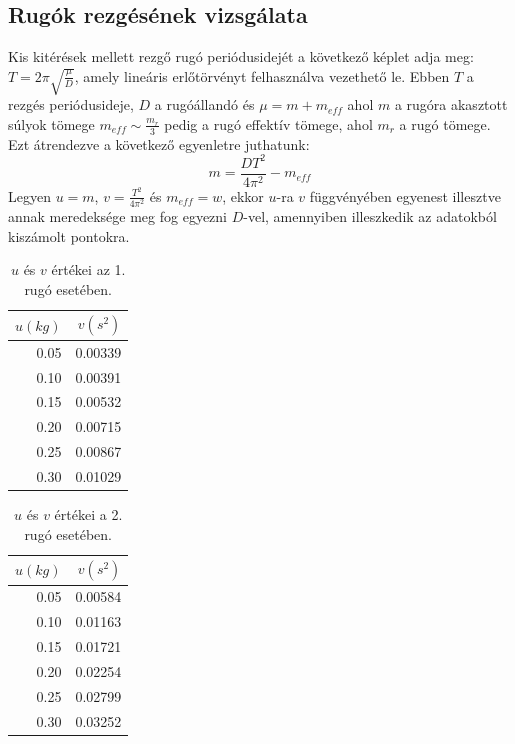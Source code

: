\documentclass[10pt,pdftex]{report}
\begin{document}
\subsection*{Rugók rezgésének vizsgálata}
Kis kitérések mellett rezgő rugó periódusidejét a következő képlet adja meg:$T=2\pi\sqrt{\frac{\mu}{D}}$, amely lineáris erlőtörvényt felhasználva vezethető le. Ebben $T$ a rezgés periódusideje, $D$ a rugóállandó és $\mu=m+m_{eff}$ ahol $m$ a rugóra akasztott súlyok tömege $m_{eff}\sim \frac{m_r}{3}$ pedig a rugó effektív tömege, ahol $m_r$ a rugó tömege. Ezt átrendezve a következő egyenletre juthatunk:
\begin{equation*}
    m=\frac{DT^2}{4\pi^2}-m_{eff}
\end{equation*}
Legyen $u=m$, $v=\frac{T^2}{4\pi^2}$ és $m_{eff}=w$, ekkor $u$-ra $v$ függvényében egyenest illesztve annak meredeksége meg fog egyezni $D$-vel, amennyiben illeszkedik az adatokból kiszámolt pontokra.
\begin{table}[H]
    \centering
    \begin{tabular}{|r|r|}
        \hline
        $u(kg)$ & $v(s^2)$ \\
        \hline
        0.05 & 0.00339 \\
        \hline
        0.10 & 0.00391 \\
        \hline
        0.15 & 0.00532 \\
        \hline
        0.20 & 0.00715 \\
        \hline
        0.25 & 0.00867 \\
        \hline
        0.30 & 0.01029 \\
        \hline
    \end{tabular}
    \caption{$u$ és $v$ értékei az 1. rugó esetében.}
\end{table}
\begin{table}[H]
    \centering
    \begin{tabular}{|r|r|}
        \hline
        $u(kg)$ & $v(s^2)$ \\
        \hline
        0.05 & 0.00584 \\
        \hline
        0.10 & 0.01163 \\
        \hline
        0.15 & 0.01721 \\
        \hline
        0.20 & 0.02254 \\
        \hline
        0.25 & 0.02799 \\
        \hline
        0.30 & 0.03252 \\
        \hline
    \end{tabular}
    \caption{$u$ és $v$ értékei a 2. rugó esetében.}
\end{table}
\end{document}
